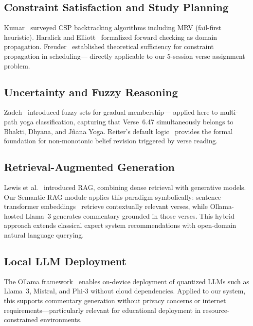 \documentclass[conference]{IEEEtran}
\begin{document}
\subsection{Constraint Satisfaction and Study Planning}

Kumar~\cite{kumar1992algorithms} surveyed CSP backtracking algorithms including
MRV (fail-first heuristic). Haralick and Elliott~\cite{haralick1980increasing}
formalized forward checking as domain propagation. Freuder~\cite{freuder1982sufficient}
established theoretical sufficiency for constraint propagation in scheduling—
directly applicable to our 5-session verse assignment problem.

\subsection{Uncertainty and Fuzzy Reasoning}

Zadeh~\cite{zadeh1965fuzzy} introduced fuzzy sets for gradual membership—
applied here to multi-path yoga classification, capturing that Verse~6.47
simultaneously belongs to Bhakti, Dhy\={a}na, and J\~{n}\={a}na Yoga.
Reiter's default logic~\cite{reiter1980logic} provides the formal foundation
for non-monotonic belief revision triggered by verse reading.

\subsection{Retrieval-Augmented Generation}

Lewis et al.~\cite{lewis2020rag} introduced RAG, combining dense retrieval
with generative models. Our Semantic RAG module applies this paradigm
symbolically: sentence-transformer embeddings~\cite{reimers2019sentencebert}
retrieve contextually relevant verses, while Ollama-hosted Llama~3 generates
commentary grounded in those verses. This hybrid approach extends classical
expert system recommendations with open-domain natural language querying.

\subsection{Local LLM Deployment}

The Ollama framework~\cite{ollama2024} enables on-device deployment of
quantized LLMs such as Llama~3, Mistral, and Phi-3 without cloud dependencies.
Applied to our system, this supports commentary generation without privacy
concerns or internet requirements—particularly relevant for educational
deployment in resource-constrained environments.
\end{document}
